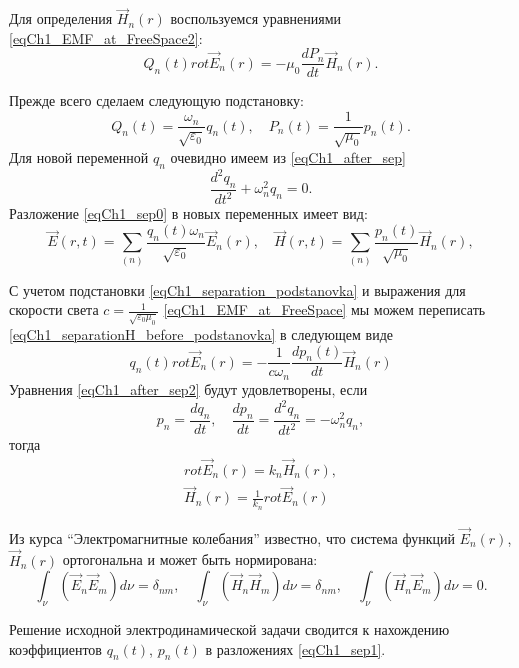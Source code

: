 Для определения $\vec{H}_n\left(r\right)$ воспользуемся уравнениями 
\eqref{eqCh1_EMF_at_FreeSpace2}:
\begin{equation}
Q_n\left(t\right)  rot
\vec{E}_n\left(r\right) = -\mu_0 \frac{d P_n}{d t}
\vec{H}_n\left(r\right).
\label{eqCh1_separationH_before_podstanovka}
\end{equation}

Прежде всего сделаем следующую подстановку:
\begin{equation}
Q_n\left(t\right) = \frac{\omega_n}{\sqrt{\varepsilon_0}}q_n\left(t\right),
\quad
P_n\left(t\right) = \frac{1}{\sqrt{\mu_0}}p_n\left(t\right).
\label{eqCh1_separation_podstanovka}
\end{equation}
Для новой переменной $q_n$ очевидно имеем из \eqref{eqCh1_after_sep}
\[
\frac{d^2 q_n}{d t^2} + \omega_n^2 q_n = 0.
\]
Разложение \eqref{eqCh1_sep0} в новых переменных имеет вид:
\begin{equation}
\vec{E}\left(r, t\right) = \sum_{(n)}
\frac{q_n\left(t\right) \omega_n}{\sqrt{\varepsilon_0}} \vec{E}_n\left(r\right),
\quad
\vec{H}\left(r, t\right) = \sum_{(n)}
\frac{p_n\left(t\right)}{\sqrt{\mu_0}} \vec{H}_n\left(r\right),
\label{eqCh1_sep1}
\end{equation}

С учетом подстановки \eqref{eqCh1_separation_podstanovka} и выражения
для скорости света $c =   \frac{1}{\sqrt{\varepsilon_0 \mu_0}}$
\eqref{eqCh1_EMF_at_FreeSpace} мы можем переписать 
\eqref{eqCh1_separationH_before_podstanovka} в следующем виде 
\begin{equation}
q_n\left(t\right) rot \vec{E}_n\left(r\right) = - \frac{1}{c \omega_n}
\frac{d p_n\left(t\right)}{d t} \vec{H}_n\left(r\right)
\label{eqCh1_after_sep2}
\end{equation}
Уравнения \eqref{eqCh1_after_sep2} будут удовлетворены, если  
\[
p_n = \frac{d q_n}{d t}, \quad \frac{d p_n}{d t} = 
\frac{d^2 q_n}{d t^2} = - \omega_n^2 q_n,
\]
тогда
\begin{eqnarray}
rot \vec{E}_n\left(r\right) = k_n \vec{H}_n\left(r\right),
\nonumber \\
\vec{H}_n\left(r\right) =  \frac{1}{k_n} rot \vec{E}_n\left(r\right)
\end{eqnarray}

Из курса ``Электромагнитные колебания'' известно, что система функций  
$\vec{E}_n\left(r\right)$, $\vec{H}_n\left(r\right)$ ортогональна и
может быть нормирована: 
\begin{equation}
\int_{\nu} \left( \vec{E}_n \vec{E}_m \right) d \nu = \delta_{nm},
\quad
\int_{\nu} \left( \vec{H}_n \vec{H}_m \right) d \nu = \delta_{nm},
\quad
\int_{\nu} \left( \vec{H}_n \vec{E}_m \right) d \nu = 0.
\label{eqCh1_task1}
\end{equation}

Решение исходной электродинамической задачи сводится к нахождению
коэффициентов  $q_n\left(t\right)$, $p_n\left(t\right)$    
в разложениях \eqref{eqCh1_sep1}.
